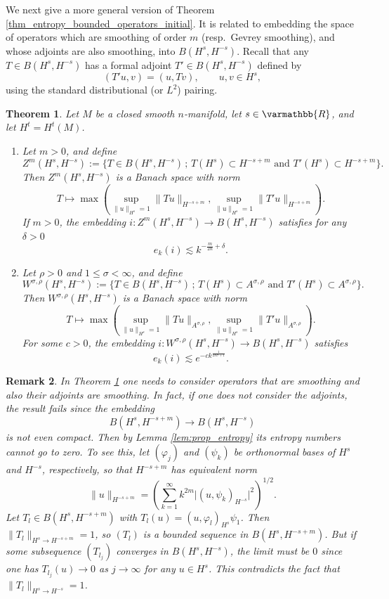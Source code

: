 \documentclass[12pt,twoside]{amsart}
\numberwithin{equation}{section}
\renewcommand{\leq}{\leqslant}
\renewcommand{\mathbb}{\varmathbb}
\newtheorem{theorem}{Theorem}[section]
\newtheorem{remark}[theorem]{Remark}
\newcommand{\mR}{\mathbb{R}}                    %
\newcommand{\abs}[1]{\lvert #1 \rvert}          %
\newcommand{\norm}[1]{\lVert #1 \rVert}         %
\begin{document}
We next give a more general version of Theorem \ref{thm_entropy_bounded_operators_initial}. It is related to embedding the space of operators which are smoothing of order $m$ (resp.\ Gevrey smoothing), and whose adjoints are also smoothing, into $B(H^s, H^{-s})$. Recall that any $T \in B(H^s, H^{-s})$ has a formal adjoint $T' \in B(H^s, H^{-s})$ defined by 
\[
(T'u, v) = (u, Tv), \qquad u, v \in H^s,
\]
using the standard distributional (or $L^2$) pairing. 


\begin{theorem} \label{thm_entropy_bounded_operators}
Let $M$ be a closed smooth $n$-manifold, let $s \in \mR$, and let $H^t = H^t(M)$. 
\begin{enumerate}
\item[(a)] 
Let $m > 0$, and define 
\[
Z^m(H^s,H^{-s}) := \{ T \in B(H^s, H^{-s}) \,;\, T(H^s) \subset H^{-s+m} \text{ and } T'(H^s) \subset H^{-s+m} \}.
\]
Then $Z^m(H^s,H^{-s})$ is a Banach space with norm 
\[
T \mapsto \max(\sup_{\norm{u}_{H^s}=1} \norm{Tu}_{H^{-s+m}}, \sup_{\norm{u}_{H^s}=1} \norm{T'u}_{H^{-s+m}}).
\]
If $m > 0$, the embedding $i: Z^m(H^s,H^{-s}) \to B(H^s, H^{-s})$ satisfies for any $\delta > 0$ 
\[
e_k(i) \lesssim k^{-\frac{m}{2n} + \delta}.
\]
\item[(b)] 
Let $\rho > 0$ and $1 \leq \sigma < \infty$, and define 
\[
W^{\sigma,\rho}(H^s, H^{-s}) := \{ T \in B(H^s, H^{-s}) \,;\, T(H^s) \subset A^{\sigma,\rho} \text{ and } T'(H^s) \subset A^{\sigma,\rho} \}.
\]
Then $W^{\sigma,\rho}(H^s, H^{-s})$ is a Banach space with norm 
\[
T \mapsto \max(\sup_{\norm{u}_{H^s}=1} \norm{Tu}_{A^{\sigma,\rho}}, \sup_{\norm{u}_{H^s}=1} \norm{T'u}_{A^{\sigma,\rho}}).
\]
For some $c > 0$, the embedding $i: W^{\sigma,\rho}(H^s, H^{-s}) \to B(H^s, H^{-s})$ satisfies 
\[
e_k(i) \lesssim e^{-c k^{\frac{1}{2n\sigma+1}}}.
\]
\end{enumerate}
\end{theorem}



\begin{remark}
In Theorem \ref{thm_entropy_bounded_operators} one needs to consider operators that are smoothing and also their adjoints are smoothing. In fact, if one does not consider the adjoints, the result fails since the embedding 
\[
B(H^s, H^{-s+m}) \to B(H^s, H^{-s})
\]
is not even compact. Then by Lemma \ref{lem:prop_entropy} its entropy numbers cannot go to zero. To see this, let $(\varphi_j)$ and $(\psi_k)$ be orthonormal bases of $H^s$ and $H^{-s}$, respectively, so that $H^{-s+m}$ has equivalent norm 
\[
\norm{u}_{H^{-s+m}} = ( \sum_{k=1}^{\infty} k^{2m} \abs{(u, \psi_k)_{H^{-s}}}^2 )^{1/2}.
\]
Let $T_l \in B(H^s, H^{-s+m})$ with $T_l(u) = (u,\varphi_l)_{H^s} \psi_1$. Then $\norm{T_l}_{H^s \to H^{-s+m}} = 1$, so $(T_l)$ is a bounded sequence in $B(H^s, H^{-s+m})$. But if some subsequence $(T_{l_j})$ converges in $B(H^s,H^{-s})$, the limit must be $0$ since one has $T_{l_j}(u) \to 0$ as $j \to \infty$ for any $u \in H^s$. This contradicts the fact that $\norm{T_l}_{H^s \to H^{-s}} = 1$.
\end{remark}
\end{document}
